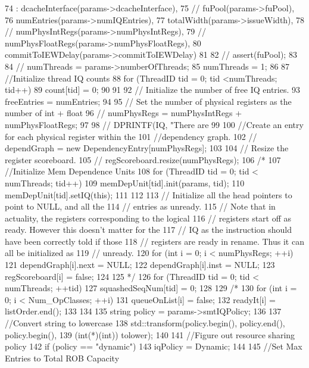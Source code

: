 \begin{DoxyCode}
74     : dcacheInterface(params->dcacheInterface),
75 //      fuPool(params->fuPool),
76       numEntries(params->numIQEntries),
77       totalWidth(params->issueWidth),
78 //      numPhysIntRegs(params->numPhysIntRegs),
79 //      numPhysFloatRegs(params->numPhysFloatRegs),
80       commitToIEWDelay(params->commitToIEWDelay)
81 {
82 //    assert(fuPool);
83 
84 //    numThreads = params->numberOfThreads;
85     numThreads = 1;
86 
87     //Initialize thread IQ counts
88     for (ThreadID tid = 0; tid <numThreads; tid++) {
89         count[tid] = 0;
90     }
91 
92     // Initialize the number of free IQ entries.
93     freeEntries = numEntries;
94 
95     // Set the number of physical registers as the number of int + float
96 //    numPhysRegs = numPhysIntRegs + numPhysFloatRegs;
97 
98 //    DPRINTF(IQ, "There are %
99 
100     //Create an entry for each physical register within the
101     //dependency graph.
102 //    dependGraph = new DependencyEntry[numPhysRegs];
103 
104     // Resize the register scoreboard.
105 //    regScoreboard.resize(numPhysRegs);
106 /*
107     //Initialize Mem Dependence Units
108     for (ThreadID tid = 0; tid < numThreads; tid++) {
109         memDepUnit[tid].init(params, tid);
110         memDepUnit[tid].setIQ(this);
111     }
112 
113     // Initialize all the head pointers to point to NULL, and all the
114     // entries as unready.
115     // Note that in actuality, the registers corresponding to the logical
116     // registers start off as ready.  However this doesn't matter for the
117     // IQ as the instruction should have been correctly told if those
118     // registers are ready in rename.  Thus it can all be initialized as
119     // unready.
120     for (int i = 0; i < numPhysRegs; ++i) {
121         dependGraph[i].next = NULL;
122         dependGraph[i].inst = NULL;
123         regScoreboard[i] = false;
124     }
125 */
126     for (ThreadID tid = 0; tid < numThreads; ++tid) {
127         squashedSeqNum[tid] = 0;
128     }
129 /*
130     for (int i = 0; i < Num_OpClasses; ++i) {
131         queueOnList[i] = false;
132         readyIt[i] = listOrder.end();
133     }
134 
135     string policy = params->smtIQPolicy;
136 
137     //Convert string to lowercase
138     std::transform(policy.begin(), policy.end(), policy.begin(),
139                    (int(*)(int)) tolower);
140 
141     //Figure out resource sharing policy
142     if (policy == "dynamic") {
143         iqPolicy = Dynamic;
144 
145         //Set Max Entries to Total ROB Capacity
}}
\end{DoxyCode}
